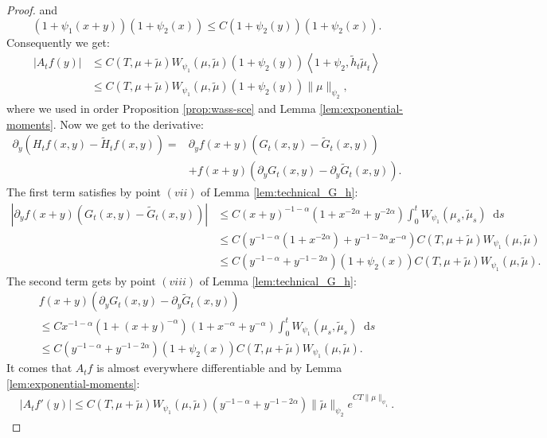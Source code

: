 \documentclass[11pt,a4paper]{article}
\newcommand{\brac}[1]{\left\langle#1\right\rangle}
\newcommand{\dd}{\mathop{}\!\mathrm{d}}
\begin{document}
\begin{proof}
    and
    \[(1 + \psi_1(x+y) )(1 +\psi_2(x)) \leq C(1 + \psi_2(y))(1 + \psi_2(x)).
    \]
    Consequently we get:
    \begin{align*}
        \left|A_tf(y)\right| 
        &\leq C(T,\mu + \tilde{\mu}) W_{\psi_1}\left(\mu,\tilde{\mu}\right)  \left(1 + \psi_2(y) \right) \brac{1+\psi_2,\tilde{h}_t\tilde{\mu}_t} \\
        &\leq C(T,\mu + \tilde{\mu}) W_{\psi_1}\left(\mu,\tilde{\mu}\right)  \left(1 + \psi_2(y) \right) \|\mu\|_{\psi_2},
    \end{align*}
    where we used in order Proposition \ref{prop:wass-sce} and Lemma \ref{lem:exponential-moments}. Now we get to the derivative:
    \begin{align*}
        \partial_y \left( H_tf(x,y)-\tilde{H}_tf(x,y)\right) =& \partial_y f(x+y) \left(G_t(x,y) - \tilde{G}_t(x,y) \right)\\
         &+ f(x+y)\left( \partial_y G_t(x,y) - \partial_y \tilde{G}_t(x,y) \right).
    \end{align*}
    The first term satisfies by point $(vii)$ of Lemma \ref{lem:technical_G_h}:
    \begin{align*}
        \left| \partial_y f(x+y) \left(G_t(x,y) - \tilde{G}_t(x,y) \right) \right| 
        &\leq C(x+y)^{-1-\alpha} (1 + x^{-2\alpha} + y^{-2\alpha}) \int_0^t W_{\psi_1}(\mu_s,\tilde{\mu}_s) \dd s \\
        &\leq C( y^{-1-\alpha}( 1 + x^{-2\alpha}) + y^{-1 - 2\alpha}x^{-\alpha} ) C(T,\mu + \tilde{\mu}) W_{\psi_1}(\mu,\tilde{\mu}) \\
        &\leq C(y^{-1-\alpha} + y^{-1 - 2\alpha})(1 + \psi_2(x)) C(T,\mu + \tilde{\mu}) W_{\psi_1}(\mu,\tilde{\mu}) .
    \end{align*}
    The second term gets by point $(viii)$ of Lemma \ref{lem:technical_G_h}:
    \begin{multline*}
        f(x+y)\left( \partial_y G_t(x,y) - \partial_y \tilde{G}_t(x,y) \right) \\
        \leq C x^{-1-\alpha} (1 + (x+y)^{-\alpha})(1 + x^{-\alpha} + y^{-\alpha}) \int_0^t W_{\psi_1}(\mu_s,\tilde{\mu}_s) \dd s \\
        \leq C(y^{-1-\alpha} + y^{-1 - 2\alpha})(1 + \psi_2(x)) C(T,\mu + \tilde{\mu}) W_{\psi_1}(\mu,\tilde{\mu}) .
    \end{multline*}
    It comes that $A_tf$ is almost everywhere differentiable and by Lemma \ref{lem:exponential-moments}:
    \begin{align*}
        \left| A_tf'(y) \right| \leq C(T,\mu + \tilde{\mu}) W_{\psi_1}(\mu,\tilde{\mu}) (y^{-1-\alpha} + y^{-1 - 2\alpha}) \|\tilde{\mu}\|_{\psi_2}e^{CT\|\mu\|_{\psi_1}}.

\end{align*}
\end{proof}
\end{document}
